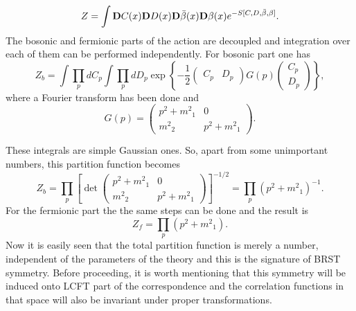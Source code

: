 \documentclass[a4paper,11pt]{article}
\begin{document}
\begin{equation}\label{eq:a140}
Z=\int{\rm\bf D}C(x){\rm\bf D}D(x){\bf D}\bar{\beta}(x){\bf
D}\beta(x)e^{-S[C,D,\bar{\beta},\beta]}.
\end{equation}
The bosonic and fermionic parts of the action are decoupled and
integration over each of them can be performed independently. For
bosonic part one has
\begin{equation}\label{eq:a141}
Z_{b} = \int\prod_pdC_{p}\int\prod_pdD_p\exp \left\{-\frac{1}{2}
(\begin{array}{ll} C_p & D_p
\end{array})
G(p) \left(\begin{array}{l}
C_p \\
D_p
\end{array}\right)\right\},
\end{equation}
where a Fourier transform has been done and
\begin{equation}\label{eq:a142}
G(p)=\left(\begin{array}{cc}
  p^2+{m^2}_1 & 0 \\
  {m^2}_2 & p^2+{m^2}_1
\end{array}\right).
\end{equation}

These integrals are simple Gaussian ones. So, apart from some
unimportant numbers, this partition function becomes
\begin{equation}\label{eq:a143}
Z_b=\prod_p\left[\det\left(\begin{array}{cc}
  p^2+{m^2}_1 & 0 \\
  {m^2}_2 & p^2+{m^2}_1
\end{array}\right)\right]^{-1/2}=\prod_p(p^2+{m^2}_1)^{-1}.
\end{equation}
For the fermionic part the the same steps can be done and the
result is
\begin{equation}\label{eq:a144}
Z_f=\prod_p(p^2+{m^2}_1).
\end{equation}
Now it is easily seen that the total partition function is merely
a number, independent of the parameters of the theory and this is
the signature of BRST symmetry. Before proceeding, it is worth
mentioning that this symmetry will be induced onto LCFT part of
the correspondence and the correlation functions in that space
will also be invariant under proper transformations.
\end{document}
